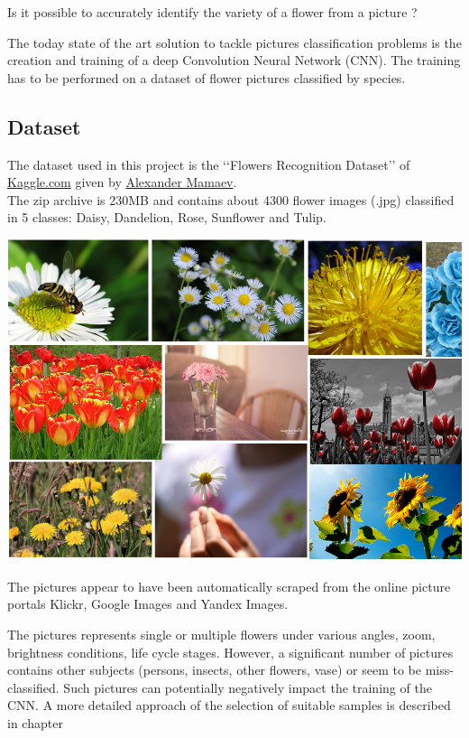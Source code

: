 Is it possible to accurately identify the variety of a flower from a picture ?

The today state of the art solution to tackle pictures classification problems is the creation and training of a deep Convolution Neural Network (CNN). The training has to be performed on a dataset  of flower pictures classified by species. 

\subsection{Dataset}

The dataset used in this project is the \lq\lq{}Flowers Recognition Dataset\rq\rq{} of  \href{https://www.kaggle.com/alxmamaev/flowers-recognition}{Kaggle.com}  given by \href{https://alxmamaev.github.io/}{Alexander Mamaev}.\\

The zip archive is 230MB and contains about 4300 flower images (.jpg) classified in 5 classes: Daisy, Dandelion, Rose, Sunflower and Tulip.

\begin{center}
\includegraphics[scale=.2]{flowers_patchwork.png}
\end{center}

The pictures appear to have been automatically scraped from the online picture portals Klickr, Google Images and Yandex Images.


The pictures represents single or multiple flowers under various angles, zoom, brightness conditions, life cycle stages. However, a significant number of pictures contains other subjects (persons, insects, other flowers, vase) or seem to be miss-classified. Such pictures can potentially negatively impact the training of the CNN. A more detailed approach of the selection of suitable samples is described in chapter  


